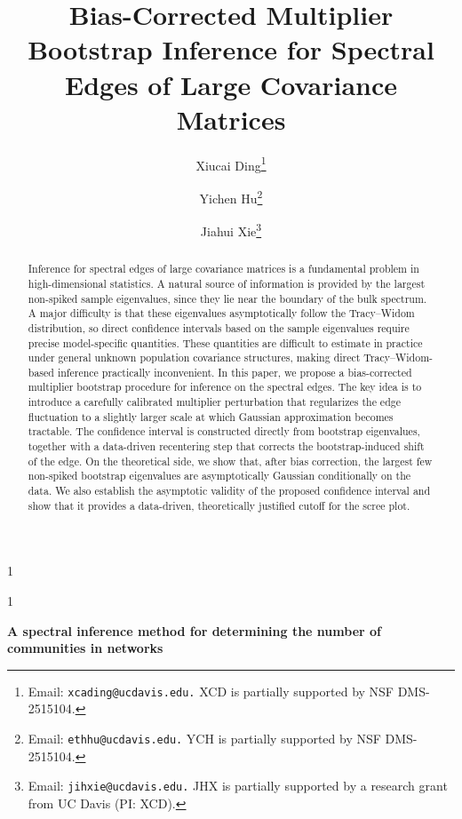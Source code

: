 \documentclass[12pt]{article}
\theoremstyle{plain}
\newcommand{\blind}{1}
\numberwithin{equation}{section}
\begin{document}
%

\def\spacingset#1{\renewcommand{\baselinestretch}%
	{#1}\small\normalsize} \spacingset{1}


\blind
{
	\title{\bf {Bias-Corrected Multiplier Bootstrap Inference for Spectral Edges of Large Covariance Matrices}}
		\author[1]{Xiucai Ding\thanks{Email: \texttt{xcading@ucdavis.edu.}  XCD is partially supported by NSF DMS-2515104.}}
	\author[1]{Yichen Hu\thanks{Email: \texttt{ethhu@ucdavis.edu.}  YCH is partially supported by NSF DMS-2515104. }}
		\author[1]{Jiahui Xie\thanks{Email: \texttt{jihxie@ucdavis.edu.} JHX is partially supported by a research grant from UC Davis (PI: XCD).}}
	\renewcommand*{\Affilfont}{\small}  %
	\renewcommand*{\Authands}{ and }  %
	\date{}  %
	\maketitle
} \fi

\blind
{
	\bigskip
	\bigskip
	\begin{center}
		{\LARGE\bf A spectral inference method for determining the number of communities in networks}
	\end{center}
	\medskip
} \fi

\vspace*{-8pt}
\begin{abstract}
Inference for spectral edges of large covariance matrices is a fundamental problem in high-dimensional statistics. A natural source of information is provided by the largest non-spiked sample eigenvalues, since they lie near the boundary of the bulk spectrum. A major difficulty is that these eigenvalues asymptotically follow the Tracy--Widom distribution, so direct confidence intervals based on the sample eigenvalues require precise model-specific quantities. These quantities are difficult to estimate in practice under general unknown population covariance structures, making direct Tracy--Widom-based inference practically inconvenient. In this paper, we propose a bias-corrected multiplier bootstrap procedure for inference on the spectral edges. The key idea is to introduce a carefully calibrated multiplier perturbation that regularizes the edge fluctuation to a slightly larger scale at which Gaussian approximation becomes tractable. The confidence interval is constructed directly from bootstrap eigenvalues, together with a data-driven recentering step that corrects the bootstrap-induced shift of the edge. On the theoretical side, we show that, after bias correction, the largest few non-spiked bootstrap eigenvalues are asymptotically Gaussian conditionally on the data. We also establish the asymptotic validity of the proposed confidence interval and show that it provides a data-driven, theoretically justified cutoff for the scree plot. 
\end{abstract}
\end{document}

